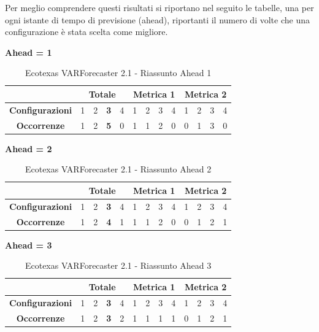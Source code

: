 \documentclass[12pt,a4paper,oneside,openright]{book}
\begin{document}
Per meglio comprendere questi risultati si riportano nel seguito le tabelle, una per ogni istante di tempo di previsione (ahead), riportanti il numero di volte che una configurazione è stata scelta come migliore.

\medskip
\textbf{Ahead = 1}


\begin{table}[H]
\centering
\begin{tabular}{|c|c|c|c|c|c|c|c|c|c|c|c|c|}
\hline
 & \multicolumn{4}{|c|}{\textbf{Totale}} & \multicolumn{4}{|c|}{\textbf{Metrica 1}} & \multicolumn{4}{|c|}{\textbf{Metrica 2}} \\
\hline
\textbf{Configurazioni} & 1 & 2 & \textbf{3} & 4 & 1 & 2 & 3 & 4 & 1 & 2 & 3 & 4 \\
\hline
\textbf{Occorrenze} & 1 & 2 & \textbf{5} & 0 & 1 & 1 & 2 & 0 & 0 & 1 & 3 & 0\\
\hline
\end{tabular}
\caption{Ecotexas VARForecaster 2.1 - Riassunto Ahead 1}
\end{table}

\medskip
\textbf{Ahead = 2}


\begin{table}[H]
\centering
\begin{tabular}{|c|c|c|c|c|c|c|c|c|c|c|c|c|}
\hline
 & \multicolumn{4}{|c|}{\textbf{Totale}} & \multicolumn{4}{|c|}{\textbf{Metrica 1}} & \multicolumn{4}{|c|}{\textbf{Metrica 2}} \\
\hline
\textbf{Configurazioni} & 1 & 2 & \textbf{3} & 4 & 1 & 2 & 3 & 4 & 1 & 2 & 3 & 4 \\
\hline
\textbf{Occorrenze} & 1 & 2 & \textbf{4} & 1 & 1 & 1 & 2 & 0 & 0 & 1 & 2 & 1\\
\hline
\end{tabular}
\caption{Ecotexas VARForecaster 2.1 - Riassunto Ahead 2}
\end{table}

\medskip
\textbf{Ahead = 3}


\begin{table}[H]
\centering
\begin{tabular}{|c|c|c|c|c|c|c|c|c|c|c|c|c|}
\hline
 & \multicolumn{4}{|c|}{\textbf{Totale}} & \multicolumn{4}{|c|}{\textbf{Metrica 1}} & \multicolumn{4}{|c|}{\textbf{Metrica 2}} \\
\hline
\textbf{Configurazioni} & 1 & 2 & \textbf{3} & 4 & 1 & 2 & 3 & 4 & 1 & 2 & 3 & 4 \\
\hline
\textbf{Occorrenze} & 1 & 2 & \textbf{3} & 2 & 1 & 1 & 1 & 1 & 0 & 1 & 2 & 1\\
\hline
\end{tabular}
\caption{Ecotexas VARForecaster 2.1 - Riassunto Ahead 3}
\end{table}
\end{document}
